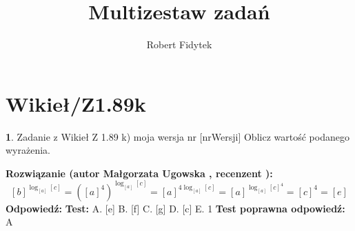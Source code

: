 \documentclass[12pt, a4paper]{article}
\title{Multizestaw zadań}
\author{Robert Fidytek}
\date{}
\theoremstyle{definition} %
\newtheorem{zad}{}
\newcommand{\kategoria}[1]{\section{#1}} %
\newcommand{\zadStart}[1]{\begin{zad}#1\newline} %
\newcommand{\zadStop}{\end{zad}}   %
\newcommand{\rozwStart}[2]{\noindent \textbf{Rozwiązanie (autor #1 , recenzent #2): }\newline} %
\newcommand{\rozwStop}{\newline}                                            %
\newcommand{\odpStart}{\noindent \textbf{Odpowiedź:}\newline}    %
\newcommand{\odpStop}{\newline}                                             %
\newcommand{\testStart}{\noindent \textbf{Test:}\newline} %
\newcommand{\testStop}{\newline} %
\newcommand{\kluczStart}{\noindent \textbf{Test poprawna odpowiedź:}\newline} %
\newcommand{\kluczStop}{\newline} %
\begin{document}
\maketitle


\kategoria{Wikieł/Z1.89k}
\zadStart{Zadanie z Wikieł Z 1.89 k) moja wersja nr [nrWersji]}
Oblicz warto\'sć podanego wyrażenia.
\zadStop
\rozwStart{Małgorzata Ugowska}{}
$$[b]^{\log_{[a]}{[c]}} = ([a]^4)^{\log_{[a]}{[c]}} = [a]^{4\log_{[a]}{[c]}} = [a]^{\log_{[a]}{[c]^4}} =[c]^4 = [e] $$
\rozwStop
\odpStart
[e]
\odpStop
\testStart
A. [e]
B. [f]
C. [g]
D. [c]
E. 1
\testStop
\kluczStart
A
\kluczStop
\end{document}

